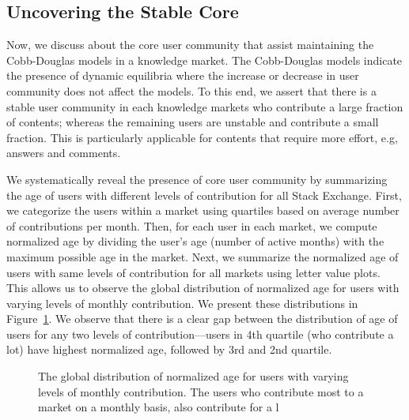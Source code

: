 \subsection{Uncovering the Stable Core} 
Now, we discuss about the core user community that assist maintaining the Cobb-Douglas models in a knowledge market. The Cobb-Douglas models indicate the presence of dynamic equilibria where the increase or decrease in user community does not affect the models. To this end, we assert that there is a stable user community in each knowledge markets who contribute a large fraction of contents; whereas the remaining users are unstable and contribute a small fraction. This is particularly applicable for contents that require more effort, e.g, answers and comments. 

We systematically reveal the presence of core user community by summarizing the age of users with different levels of contribution for all Stack Exchange. First, we categorize the users within a market using quartiles based on average number of contributions per month. Then, for each user in each market, we compute normalized age by dividing the user's age (number of active months) with the maximum possible age in the market. Next, we summarize the normalized age of users with same levels of contribution for all markets using letter value plots. This allows us to observe the global distribution of normalized age for users with varying levels of monthly contribution. We present these distributions in Figure~\ref{fig:age_vs_contribution}. We observe that there is a clear gap between the distribution of age of users for any two levels of contribution---users in 4th quartile (who contribute a lot) have highest normalized age, followed by 3rd and 2nd quartile. 

\begin{figure}[hbt]
\centering
\caption{The global distribution of normalized age for users with varying levels of monthly contribution. The users who contribute most to a market on a monthly basis, also contribute for a l}
\label{fig:age_vs_contribution}
\end{figure}


